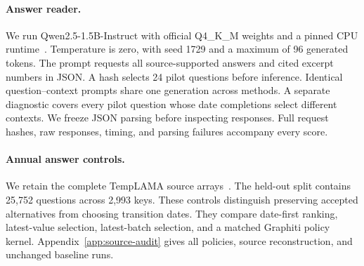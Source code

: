 \paragraph{Answer reader.}
We run Qwen2.5-1.5B-Instruct with official Q4\_K\_M weights and a pinned CPU runtime~\citep{qwen2024model}.
Temperature is zero, with seed 1729 and a maximum of 96 generated tokens.
The prompt requests all source-supported answers and cited excerpt numbers in JSON.
A hash selects 24 pilot questions before inference.
Identical question--context prompts share one generation across methods.
A separate diagnostic covers every pilot question whose date completions select different contexts.
We freeze JSON parsing before inspecting responses.
Full request hashes, raw responses, timing, and parsing failures accompany every score.

\paragraph{Annual answer controls.}
We retain the complete TempLAMA source arrays~\citep{dhingra2022templama}.
The held-out split contains 25,752 questions across 2,993 keys.
These controls distinguish preserving accepted alternatives from choosing transition dates.
They compare date-first ranking, latest-value selection, latest-batch selection, and a matched Graphiti policy kernel.
Appendix~\ref{app:source-audit} gives all policies, source reconstruction, and unchanged baseline runs.
